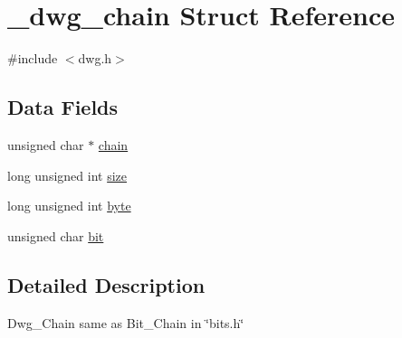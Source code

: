 \hypertarget{struct__dwg__chain}{\section{\-\_\-dwg\-\_\-chain \-Struct \-Reference}
\label{struct__dwg__chain}
}


{\ttfamily \#include $<$dwg.\-h$>$}

\subsection*{\-Data \-Fields}
\begin{DoxyCompactItemize}
\item 
unsigned char $\ast$ \hyperlink{struct__dwg__chain_a83b23420da491f8e12cf6f635aa38a23}{chain}
\item 
long unsigned int \hyperlink{struct__dwg__chain_a83e91244124cb475f4ac9eee082d7462}{size}
\item 
long unsigned int \hyperlink{struct__dwg__chain_a0017d0a80fcf01967cc0e3afd75c2348}{byte}
\item 
unsigned char \hyperlink{struct__dwg__chain_ac42af759d64497542076d7c08bb3da1c}{bit}
\end{DoxyCompactItemize}


\subsection{\-Detailed \-Description}
\-Dwg\-\_\-\-Chain same as \-Bit\-\_\-\-Chain in \char`\"{}bits.\-h\char`\"{} 


